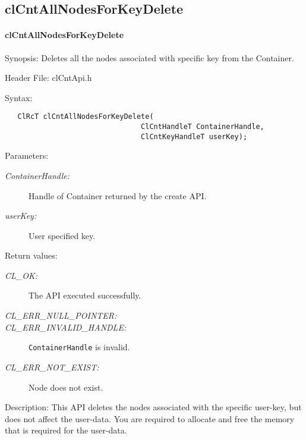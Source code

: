 \subsection{clCntAllNodesForKeyDelete}
\hypertarget{pagecnt107}{}\paragraph{cl\-Cnt\-All\-Nodes\-For\-Key\-Delete}\label{pagecnt107}
\begin{Desc}
\item[Synopsis:]Deletes all the nodes associated with specific key from the Container.\end{Desc}
\begin{Desc}
\item[Header File:]clCntApi.h\end{Desc}
\begin{Desc}
\item[Syntax:]

\footnotesize\begin{verbatim}   ClRcT clCntAllNodesForKeyDelete(
                         		ClCntHandleT ContainerHandle,
                         		ClCntKeyHandleT userKey);
\end{verbatim}
\normalsize
\end{Desc}
\begin{Desc}
\item[Parameters:]
\begin{description}
\item[{\em Container\-Handle:}]Handle of Container returned by the create API. 
\item[{\em user\-Key:}]User specified key.\end{description}
\end{Desc}
\begin{Desc}
\item[Return values:]
\begin{description}
\item[{\em CL\_\-OK:}]The API executed successfully. 
\item[{\em CL\_\-ERR\_\-NULL\_\-POINTER:}] 
\item[{\em CL\_\-ERR\_\-INVALID\_\-HANDLE:}] {\tt{ContainerHandle}} is invalid.
\item[{\em CL\_\-ERR\_\-NOT\_\-EXIST:}]Node does not exist. \end{description}
\end{Desc}
\begin{Desc}
\item[Description:]This API deletes the nodes associated with the specific user-key, but does not affect the user-data. You are required to allocate and
free the memory that is required for the user-data.
\end{Desc}
